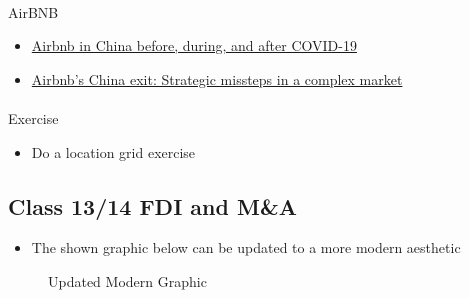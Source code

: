\documentclass[
  11pt,
]{article}
\makeatletter
\let\oldparagraph\paragraph
\renewcommand{\paragraph}{
    \@ifstar
      \xxxParagraphStar
      \xxxParagraphNoStar
  }
\newcommand{\xxxParagraphStar}[1]{\oldparagraph*{#1}\mbox{}}
\newcommand{\xxxParagraphNoStar}[1]{\oldparagraph{#1}\mbox{}}
\providecommand{\tightlist}{%
  \setlength{\itemsep}{0pt}\setlength{\parskip}{0pt}}
\makeatother
\begin{document}
\paragraph{AirBNB}\label{airbnb}

\begin{itemize}
\tightlist
\item
  \href{https://uq.pressbooks.pub/airbnb-978-1-74272-321-1/chapter/airbnb-in-china-before-during-and-after-covid-19/}{Airbnb
  in China before, during, and after COVID-19}
\item
  \href{https://medium.com/eastora-insights/airbnbs-china-exit-strategic-missteps-in-a-complex-market-86a26602e08d}{Airbnb's
  China exit: Strategic missteps in a complex market}
\end{itemize}

\paragraph{Exercise}\label{exercise}

\begin{itemize}
\tightlist
\item
  Do a location grid exercise
\end{itemize}

\subsection{Class 13/14 FDI and M\&A}\label{class13-14}

\begin{itemize}
\tightlist
\item
  The shown graphic below can be updated to a more modern aesthetic
\end{itemize}

\begin{figure}


\caption{\label{fig-2}Updated Modern Graphic}

\end{figure}%
\end{document}
